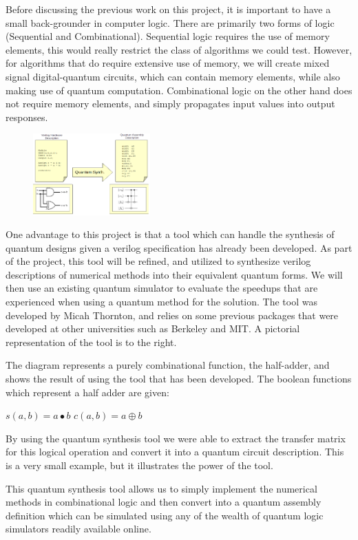Before discussing the previous work on this project, it is important to have a small back-grounder in computer logic. There are primarily two forms of logic (Sequential and Combinational). Sequential logic requires the use of memory elements, this would really restrict the class of algorithms we could test. However, for algorithms that do require extensive use of memory, we will create mixed signal digital-quantum circuits, which can contain memory elements, while also making use of quantum computation. Combinational logic on the other hand does not require memory elements, and simply propagates input values into output responses.



    \begin{figure}
   \begin{center}
    \includegraphics[width=0.40\textwidth]{QuantumSynthesis.png}
  \end{center}
\end{figure}
One advantage to this project is that a tool which can handle the synthesis of quantum designs given a verilog specification has already been developed. 
As part of the project, this tool will be refined, and utilized to synthesize verilog descriptions of numerical methods into their equivalent quantum forms. 
We will then use an existing quantum simulator to evaluate the speedups that are experienced when using a quantum method for the solution. 
The tool was developed by Micah Thornton, and relies on some previous packages that were developed at other universities such as Berkeley and MIT. 
A pictorial representation of the tool is to the right. 

The diagram represents a purely combinational function, the half-adder, and shows the result of using the tool that has been developed. The boolean functions which represent a half adder are given: 
\begin{center}
$s(a,b) = a \bullet b$
\hspace{5 em}
$c(a,b) = a \oplus b$
\end{center}

By using the quantum synthesis tool we were able to extract the transfer matrix for this logical operation and convert it into a quantum circuit description. This is a very small example, but it illustrates the power of the tool.

This quantum synthesis tool allows us to simply implement the numerical methods in combinational logic and then convert into a quantum assembly definition which can be simulated using any of the wealth of quantum logic simulators readily available online.